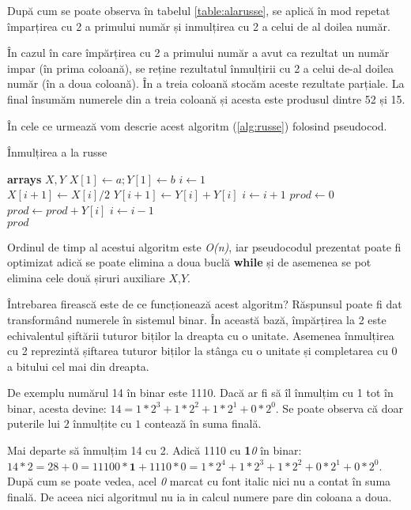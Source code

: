 După cum se poate observa în tabelul \ref{table:alarusse}, se aplică în mod repetat împarțirea cu 2 a primului număr și inmulțirea cu 2 a celui de al doilea număr.

 În cazul în care împărțirea cu 2 a primului număr a avut ca rezultat un număr impar (în prima coloană), se reține rezultatul înmulțirii cu 2 a celui de-al doilea număr (în a doua coloană). În a treia coloană stocăm aceste rezultate parțiale. La final însumăm numerele din a treia coloană și acesta este produsul dintre 52 și 15.

În cele ce urmează vom descrie acest algoritm (\ref{alg:russe}) folosind pseudocod.

\begin{algorithm}
	\caption{Înmulțirea a la russe}\label{alg:russe}
	\begin{algorithmic}[1]
		
		\State \textbf{arrays} $X,Y$
		\State $X[1] \gets a;Y[1] \gets b$
		\State $i \gets 1$	\\	
		 \hfill \tab{}\tab{}\tab{}\tab{}
		\State $X[i+1] \gets X[i] / 2$
		\State $Y[i+1] \gets Y[i] + Y[i]$
		\State $i \gets i+1$
		\EndWhile
		\State $prod \gets 0$
		\State $prod \gets prod + Y[i]$
		\EndIf
		\State $i \gets i-1$
		\EndWhile \\
		\Return $prod$
		\EndProcedure
	\end{algorithmic}
\end{algorithm}

Ordinul de timp al acestui algoritm este \textit{O(n)}, iar pseudocodul prezentat poate fi optimizat adică se poate elimina a doua buclă \textbf{while} și de asemenea se pot elimina cele două șiruri auxiliare $X$,$Y$.

Întrebarea firească este de ce funcționează acest algoritm? Răspunsul poate fi dat transformând numerele în sistemul binar. În această bază, împărțirea la 2 este echivalentul șiftării tuturor biților la dreapta cu o unitate. Asemenea înmulțirea cu 2 reprezintă șiftarea tuturor biților la stânga cu o unitate și completarea cu 0 a bitului cel mai din dreapta.

De exemplu numărul 14 în binar este 1110. Dacă ar fi să îl înmulțim cu 1 tot în binar, acesta devine: $14 = 1*2^{3} + 1*2^{2} + 1*2^{1} + 0*2^{0} $. 
Se poate observa că doar puterile lui $2$ înmulțite cu $1$ contează în suma finală.

Mai departe să înmulțim 14 cu 2. Adică 1110 cu \textbf{1}\textit{0} în binar: $14*2 = 28 + 0 = 11100*\textbf{1}  + 1110*\textit{0}  =1*2^{4} +  1*2^{3} + 1*2^{2} + 0*2^{1} + 0*2^{0}$. După cum se poate vedea, acel \textit{0} marcat cu font italic nici nu a contat în suma finală. De aceea nici algoritmul nu ia in calcul numere pare din coloana a doua. 

